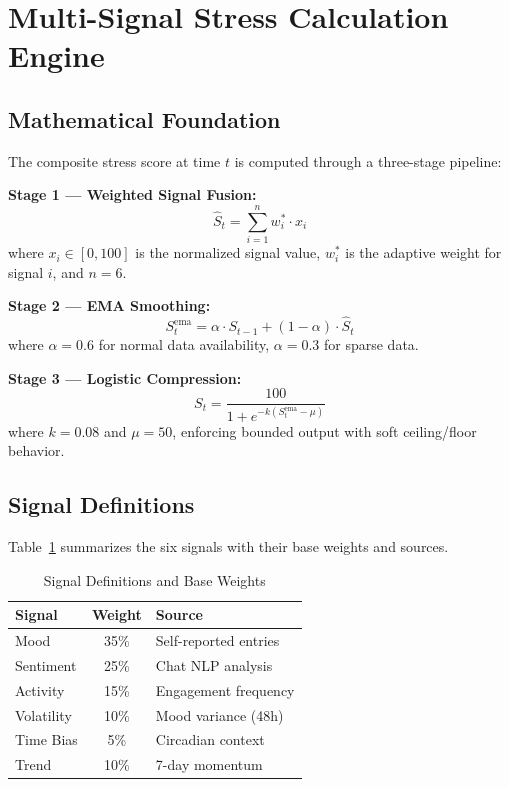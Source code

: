 \documentclass[conference]{IEEEtran}
\begin{document}
\section{Multi-Signal Stress Calculation Engine}

\subsection{Mathematical Foundation}

The composite stress score at time $t$ is computed through a three-stage pipeline:

\textbf{Stage 1 --- Weighted Signal Fusion:}
\begin{equation}
\hat{S}_t = \sum_{i=1}^{n} w_i^{*} \cdot x_i
\end{equation}
where $x_i \in [0, 100]$ is the normalized signal value, $w_i^{*}$ is the adaptive weight for signal $i$, and $n = 6$.

\textbf{Stage 2 --- EMA Smoothing:}
\begin{equation}
S_t^{\text{ema}} = \alpha \cdot S_{t-1} + (1 - \alpha) \cdot \hat{S}_t
\end{equation}
where $\alpha = 0.6$ for normal data availability, $\alpha = 0.3$ for sparse data.

\textbf{Stage 3 --- Logistic Compression:}
\begin{equation}
S_t = \frac{100}{1 + e^{-k(S_t^{\text{ema}} - \mu)}}
\end{equation}
where $k = 0.08$ and $\mu = 50$, enforcing bounded output with soft ceiling/floor behavior.

\subsection{Signal Definitions}

Table~\ref{tab:signals} summarizes the six signals with their base weights and sources.

\begin{table}[htbp]
\caption{Signal Definitions and Base Weights}
\begin{center}
\begin{tabular}{|l|c|l|}
\hline
\textbf{Signal} & \textbf{Weight} & \textbf{Source} \\
\hline
Mood & 35\% & Self-reported entries \\
Sentiment & 25\% & Chat NLP analysis \\
Activity & 15\% & Engagement frequency \\
Volatility & 10\% & Mood variance (48h) \\
Time Bias & 5\% & Circadian context \\
Trend & 10\% & 7-day momentum \\
\hline
\end{tabular}
\label{tab:signals}
\end{center}
\end{table}
\end{document}
